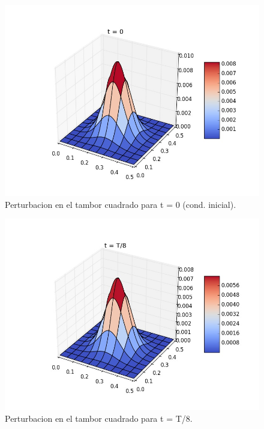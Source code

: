 \documentclass{article}
\begin{document}
\begin{center}
  \begin{figure}[t]
    \includegraphics[width=\textwidth]{tambor_t0}
    \centering
    \\
    Perturbacion en el tambor cuadrado para t = 0 (cond. inicial).
  \end{figure}

  \begin{figure}[t]
    \includegraphics[width=\textwidth]{tambor_t8}
    \centering
    \\
    Perturbacion en el tambor cuadrado para t = T/8.
  \end{figure}


\end{center}
\end{document}
